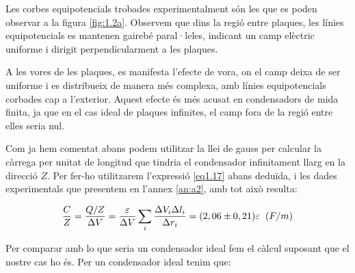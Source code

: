 \documentclass[a4paper,10.5pt]{report}
\begin{document}
Les corbes equipotencials trobades experimentalment són les que es poden observar a la figura \ref{fig:1.2a}. Observem que dins la regió entre plaques, les línies equipotencials es mantenen gairebé paral·leles, indicant un camp elèctric uniforme i dirigit perpendicularment a les plaques. 

A les vores de les plaques, es manifesta l’efecte de vora, on el camp deixa de ser uniforme i es distribueix de manera més complexa, amb línies equipotencials corbades cap a l’exterior. Aquest efecte és més acusat en condensadors de mida finita, ja que en el cas ideal de plaques infinites, el camp fora de la regió entre elles seria nul. 

Com ja hem comentat abans podem utilitzar la llei de gauss per calcular la càrrega per unitat de longitud que tindria el condensador infinitament llarg en la direcció $Z$. Per fer-ho utilitzarem l'expressió \eqref{eq1.17} abans deduïda, i les dades experimentals que presentem en l'annex \ref{an:a2}, amb tot això resulta:

\begin{equation}
	\frac{C}{Z} = \frac{Q/Z}{\Delta V} = \frac{\varepsilon}{\Delta V} \sum_i \frac{\Delta V_i \Delta l_i}{\Delta r_i} = (2,06 \pm 0,21)\varepsilon \hspace{0,2cm} (F/m)
\end{equation}

Per comparar amb lo que seria un condensador ideal fem el càlcul suposant que el nostre cas ho és. Per un condensador ideal tenim que:
\end{document}
